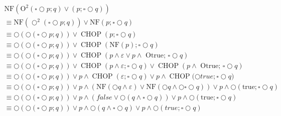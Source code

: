 $\begin{array}{l}{\mathrm{NF}\left(\mathrm{O}^{2}(\square \bigcirc p ; q) \vee(p ; \square \bigcirc q)\right)} \\

\equiv \mathrm{NF}\left(\bigcirc^{2}(\square \bigcirc p ; q)\right) \vee \mathrm{NF}(p ; \square \bigcirc q) \\

\equiv \bigcirc(\bigcirc(\square \bigcirc p ; q)) \vee \operatorname{CHOP}(p ; \square \bigcirc q) \\

\equiv \bigcirc(\bigcirc(\square \bigcirc p ; q)) \vee \operatorname{CHOP}(\mathrm{NF}(p) ; \square \bigcirc q) \\

\equiv \bigcirc(\bigcirc(\square \bigcirc p ; q)) \vee \operatorname{CHOP}(p \wedge \varepsilon \vee p \wedge \text { Otrue; } \square \bigcirc q) \\

\equiv \bigcirc(\bigcirc(\square \bigcirc p ; q)) \vee \operatorname{CHOP}(p \wedge \varepsilon ; \square \bigcirc q) \vee \operatorname{CHOP}(p \wedge \text { Otrue; } \square \bigcirc q) \\

\equiv \bigcirc(\bigcirc(\square \bigcirc p ; q)) \vee p \wedge \operatorname{CHOP}(\varepsilon ; \square \bigcirc q) \vee p \wedge { \operatorname{CHOP}(\bigcirc true;} \square \bigcirc q ) \\

\equiv \bigcirc(\bigcirc(\square \bigcirc p ; q)) \vee p \wedge(\mathrm{NF}(\bigcirc q \wedge \varepsilon) \vee \mathrm{NF}(\bigcirc q \wedge \bigcirc \square \bigcirc q)) \vee p \wedge \bigcirc(\text {true} ; \square \bigcirc q) \\

{\equiv \bigcirc(\bigcirc(\square \bigcirc p ; q)) \vee p \wedge(f a l s e \vee \bigcirc(q \wedge \square \bigcirc q)) \vee p \wedge \bigcirc(\text {true} ; \square \bigcirc q)} \\ {\equiv \bigcirc(\bigcirc(\square \bigcirc p ; q)) \vee p \wedge \bigcirc(q \wedge \square \bigcirc q) \vee p \wedge \bigcirc(t r u e ; \square \bigcirc q)}
\end{array}$
~\\
\newpage

